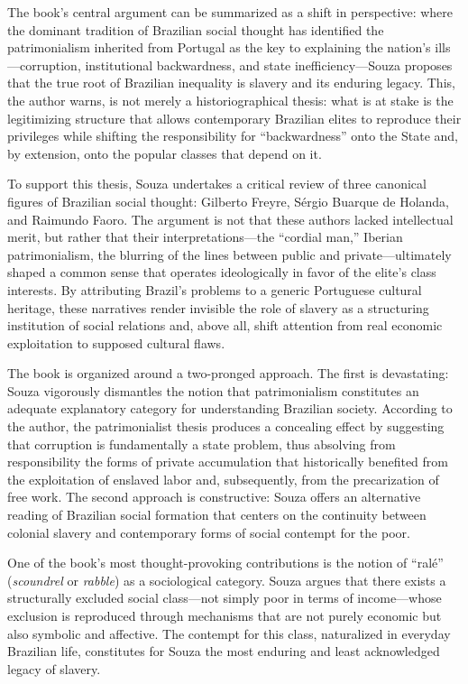 \documentclass{article}
\begin{document}
The book’s central argument can be summarized as a shift in perspective: where the dominant tradition of Brazilian social thought has identified the patrimonialism inherited from Portugal as the key to explaining the nation’s ills—corruption, institutional backwardness, and state inefficiency—Souza proposes that the true root of Brazilian inequality is slavery and its enduring legacy. This, the author warns, is not merely a historiographical thesis: what is at stake is the legitimizing structure that allows contemporary Brazilian elites to reproduce their privileges while shifting the responsibility for “backwardness” onto the State and, by extension, onto the popular classes that depend on it.

To support this thesis, Souza undertakes a critical review of three canonical figures of Brazilian social thought: Gilberto Freyre, Sérgio Buarque de Holanda, and Raimundo Faoro. The argument is not that these authors lacked intellectual merit, but rather that their interpretations—the “cordial man,” Iberian patrimonialism, the blurring of the lines between public and private—ultimately shaped a common sense that operates ideologically in favor of the elite’s class interests. By attributing Brazil’s problems to a generic Portuguese cultural heritage, these narratives render invisible the role of slavery as a structuring institution of social relations and, above all, shift attention from real economic exploitation to supposed cultural flaws.

The book is organized around a two-pronged approach. The first is devastating: Souza vigorously dismantles the notion that patrimonialism constitutes an adequate explanatory category for understanding Brazilian society. According to the author, the patrimonialist thesis produces a concealing effect by suggesting that corruption is fundamentally a state problem, thus absolving from responsibility the forms of private accumulation that historically benefited from the exploitation of enslaved labor and, subsequently, from the precarization of free work. The second approach is constructive: Souza offers an alternative reading of Brazilian social formation that centers on the continuity between colonial slavery and contemporary forms of social contempt for the poor.

One of the book’s most thought-provoking contributions is the notion of “ralé” (\textit{scoundrel} or \textit{rabble}) as a sociological category. Souza argues that there exists a structurally excluded social class—not simply poor in terms of income—whose exclusion is reproduced through mechanisms that are not purely economic but also symbolic and affective. The contempt for this class, naturalized in everyday Brazilian life, constitutes for Souza the most enduring and least acknowledged legacy of slavery.
\end{document}
